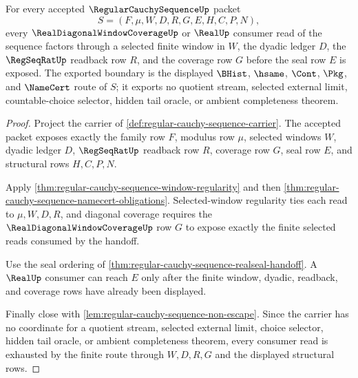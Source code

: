 \begin{theorem}
\label{thm:regular-cauchy-sequence-finite-window-exhaustion}
For every accepted $\RegularCauchySequenceUp$ packet
$$
S=(F,\mu,W,D,R,G,E,H,C,P,N),
$$
every $\RealDiagonalWindowCoverageUp$ or $\RealUp$ consumer read of the sequence factors through a selected finite window in $W$, the dyadic ledger $D$, the $\RegSeqRatUp$ readback row $R$, and the coverage row $G$ before the seal row $E$ is exposed. The exported boundary is the displayed $\BHist$, $\hsame$, $\Cont$, $\Pkg$, and $\NameCert$ route of $S$; it exports no quotient stream, selected external limit, countable-choice selector, hidden tail oracle, or ambient completeness theorem.
\end{theorem}
\begin{proof}
Project the carrier of \autoref{def:regular-cauchy-sequence-carrier}. The accepted packet exposes exactly the family row $F$, modulus row $\mu$, selected windows $W$, dyadic ledger $D$, $\RegSeqRatUp$ readback row $R$, coverage row $G$, seal row $E$, and structural rows $H,C,P,N$.

Apply \autoref{thm:regular-cauchy-sequence-window-regularity} and then \autoref{thm:regular-cauchy-sequence-namecert-obligations}. Selected-window regularity ties each read to $\mu,W,D,R$, and diagonal coverage requires the $\RealDiagonalWindowCoverageUp$ row $G$ to expose exactly the finite selected reads consumed by the handoff.

Use the seal ordering of \autoref{thm:regular-cauchy-sequence-realseal-handoff}. A $\RealUp$ consumer can reach $E$ only after the finite window, dyadic, readback, and coverage rows have already been displayed.

Finally close with \autoref{lem:regular-cauchy-sequence-non-escape}. Since the carrier has no coordinate for a quotient stream, selected external limit, choice selector, hidden tail oracle, or ambient completeness theorem, every consumer read is exhausted by the finite route through $W,D,R,G$ and the displayed structural rows.
\end{proof}

